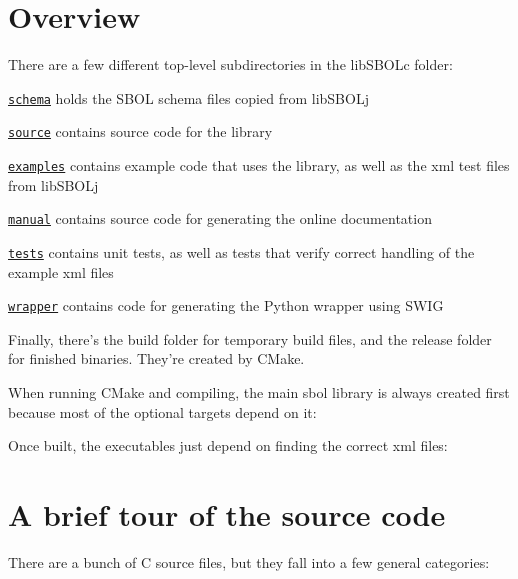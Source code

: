 \hypertarget{index_overview}{}\section{Overview}\label{index_overview}
There are a few different top-\/level subdirectories in the lib\+S\+B\+O\+Lc folder\+:


\begin{DoxyItemize}
\item \href{https://github.com/SynBioDex/libSBOLc/tree/master/schema}{\tt schema} holds the S\+B\+O\+L schema files copied from lib\+S\+B\+O\+Lj
\item \href{https://github.com/SynBioDex/libSBOLc/tree/master/source}{\tt source} contains source code for the library
\item \href{https://github.com/SynBioDex/libSBOLc/tree/master/examples}{\tt examples} contains example code that uses the library, as well as the xml test files from lib\+S\+B\+O\+Lj
\item \href{https://github.com/SynBioDex/libSBOLc/tree/master/manual}{\tt manual} contains source code for generating the online documentation
\item \href{https://github.com/SynBioDex/libSBOLc/tree/master/tests}{\tt tests} contains unit tests, as well as tests that verify correct handling of the example xml files
\item \href{https://github.com/SynBioDex/libSBOLc/tree/master/wrapper}{\tt wrapper} contains code for generating the Python wrapper using S\+W\+I\+G
\item Finally, there's the build folder for temporary build files, and the release folder for finished binaries. They're created by C\+Make.
\end{DoxyItemize}

When running C\+Make and compiling, the main sbol library is always created first because most of the optional targets depend on it\+: 

Once built, the executables just depend on finding the correct xml files\+: \hypertarget{index_tour}{}\section{A brief tour of the source code}\label{index_tour}
There are a bunch of C source files, but they fall into a few general categories\+:


